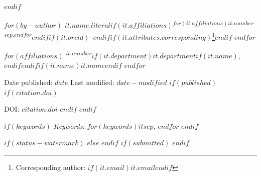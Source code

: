 \vspace*{\dimexpr 2.5cm + \computobannerheight - 5cm\relax}
$endif$
\begin{center}
  $for(by-author)$
    \textbf{$it.name.literal$}$if(it.affiliations)$\textsuperscript{$for(it.affiliations)$$it.number$$sep$,$endfor$}$endif$$if(it.orcid)$~$endif$$if(it.attributes.corresponding)${\renewcommand{\thefootnote}{\fnsymbol{footnote}}\footnote{Corresponding author: $if(it.email)$\href{mailto:$it.email$}{$it.email$}$endif$}}$endif$\quad
  $endfor$

  \smallskip
  {\small
  $for(affiliations)$
    \textsuperscript{$it.number$}$if(it.department)$$it.department$$if(it.name)$, $endif$$endif$$if(it.name)$$it.name$$endif$\quad
  $endfor$
  }

  \bigskip

  Date published: $date$ \quad Last modified: $date-modified$
  $if(published)$
  $if(citation.doi)$

  \smallskip
  DOI: \href{https://doi.org/$citation.doi$}{$citation.doi$}
  $endif$
  $endif$
\end{center}

\bigskip
\begin{abstract}
$abstract$
\end{abstract}

$if(keywords)$
\noindent%
{\it Keywords:} $for(keywords)$$it$$sep$, $endfor$
\vfill
$endif$

$if(status-watermark)$
$else$
$endif$
$if(submitted)$
\linenumbers
$endif$

